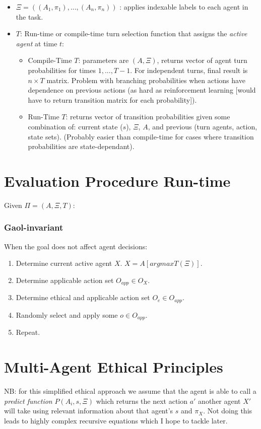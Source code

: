 \documentclass{article}
\begin{document}
\begin{itemize}
\item $\Xi=((A_1,\pi_1), ... , (A_n, \pi_n))$ : applies indexable labels to each agent in the task.
\item $T$: Run-time or compile-time turn selection function that assigns the \textit{active agent} at time $t$:
\begin{itemize}
\item Compile-Time $T$: parameters are $(A, \Xi)$, returns vector of agent turn probabilities for times $1,...,T-1$. For independent turns, final result is $n \times T$ matrix. Problem with branching probabilities when actions have dependence on previous actions (as hard as reinforcement learning [would have to return transition matrix for each probability]).
\item Run-Time $T$: returns vector of transition probabilities given some combination of: current state ($s$), $\Xi$, $A$, and previous (turn agents, action, state sets). (Probably easier than compile-time for cases where transition probabilities are state-dependant).
\end{itemize}
\end{itemize}

\section{Evaluation Procedure Run-time}
Given $\Pi=(A, \Xi, T)$:

\subsubsection*{Gaol-invariant}
When the goal does not affect agent decisions:
\begin{enumerate}
\item Determine current active agent $X$. $X = A[argmax T(\Xi)]$.
\item Determine applicable action set $O_{app} \in O_X$.
\item Determine ethical and applicable action set $O_{e} \in O_{app}$.
\item Randomly select and apply some $o \in O_{app}$.
\item Repeat.

\end{enumerate}

\section{Multi-Agent Ethical Principles}
NB: for this simplified ethical approach we assume that the agent is able to call a \textit{predict function} $P(A_i, s, \Xi)$ which returns the next action $a'$ another agent $X'$ will take using relevant information about that agent's $s$ and $\pi_X$. Not doing this leads to highly complex recursive equations which I hope to tackle later.
\end{document}
